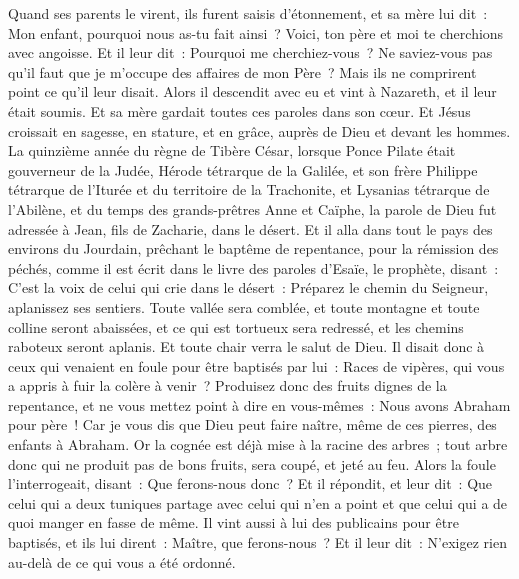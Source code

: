 \begin{multicols}{2}
Quand ses parents le virent, ils furent saisis d'étonnement, et sa mère lui dit~: Mon enfant, pourquoi nous as-tu fait ainsi~? Voici, ton père et moi te cherchions avec angoisse.
Et il leur dit~: Pourquoi me cherchiez-vous~? Ne saviez-vous pas qu'il faut que je m'occupe des affaires de mon Père~?
Mais ils ne comprirent point ce qu'il leur disait.
Alors il descendit avec eu et vint à Nazareth, et il leur était soumis. Et sa mère gardait toutes ces paroles dans son cœur.
Et Jésus croissait en sagesse, en stature, et en grâce, auprès de Dieu et devant les hommes.
\VerseOne{}La quinzième année du règne de Tibère César, lorsque Ponce Pilate était gouverneur de la Judée, Hérode tétrarque de la Galilée, et son frère Philippe tétrarque de l'Iturée et du territoire de la Trachonite, et Lysanias tétrarque de l'Abilène,
et du temps des grands-prêtres Anne et Caïphe, la parole de Dieu fut adressée à Jean, fils de Zacharie, dans le désert.
Et il alla dans tout le pays des environs du Jourdain, prêchant le baptême de repentance, pour la rémission des péchés,
comme il est écrit dans le livre des paroles d'Esaïe, le prophète, disant~: C'est la voix de celui qui crie dans le désert~: Préparez le chemin du Seigneur, aplanissez ses sentiers.
Toute vallée sera comblée, et toute montagne et toute colline seront abaissées, et ce qui est tortueux sera redressé, et les chemins raboteux seront aplanis.
Et toute chair verra le salut de Dieu.
Il disait donc à ceux qui venaient en foule pour être baptisés par lui~: Races de vipères, qui vous a appris à fuir la colère à venir~?
Produisez donc des fruits dignes de la repentance, et ne vous mettez point à dire en vous-mêmes~: Nous avons Abraham pour père~! Car je vous dis que Dieu peut faire naître, même de ces pierres, des enfants à Abraham.
Or la cognée est déjà mise à la racine des arbres~; tout arbre donc qui ne produit pas de bons fruits, sera coupé, et jeté au feu.
Alors la foule l'interrogeait, disant~: Que ferons-nous donc~?
Et il répondit, et leur dit~: Que celui qui a deux tuniques partage avec celui qui n'en a point et que celui qui a de quoi manger en fasse de même.
Il vint aussi à lui des publicains pour être baptisés, et ils lui dirent~: Maître, que ferons-nous~?
Et il leur dit~: N'exigez rien au-delà de ce qui vous a été ordonné.

\end{multicols}
